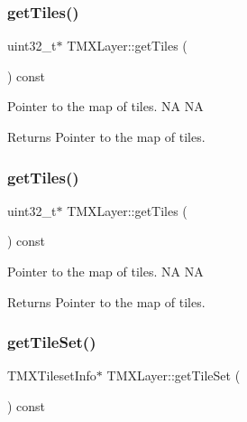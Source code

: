\subsubsection{\texorpdfstring{get\+Tiles()}{getTiles()}\hspace{0.1cm}{\footnotesize\ttfamily [1/2]}}
{\footnotesize\ttfamily uint32\+\_\+t$\ast$ T\+M\+X\+Layer\+::get\+Tiles (\begin{DoxyParamCaption}{ }\end{DoxyParamCaption}) const\hspace{0.3cm}{\ttfamily [inline]}}

Pointer to the map of tiles.  NA  NA \begin{DoxyReturn}{Returns}
Pointer to the map of tiles. 
\end{DoxyReturn}
\mbox{\label{classTMXLayer_a99a6fdaff73922809a3b2edbeb6d15e8}} 
\subsubsection{\texorpdfstring{get\+Tiles()}{getTiles()}\hspace{0.1cm}{\footnotesize\ttfamily [2/2]}}
{\footnotesize\ttfamily uint32\+\_\+t$\ast$ T\+M\+X\+Layer\+::get\+Tiles (\begin{DoxyParamCaption}{ }\end{DoxyParamCaption}) const\hspace{0.3cm}{\ttfamily [inline]}}

Pointer to the map of tiles.  NA  NA \begin{DoxyReturn}{Returns}
Pointer to the map of tiles. 
\end{DoxyReturn}
\mbox{\label{classTMXLayer_a2f1133ee7af2fa00682c68b5bca6541b}} 
\subsubsection{\texorpdfstring{get\+Tile\+Set()}{getTileSet()}\hspace{0.1cm}{\footnotesize\ttfamily [1/2]}}
{\footnotesize\ttfamily T\+M\+X\+Tileset\+Info$\ast$ T\+M\+X\+Layer\+::get\+Tile\+Set (\begin{DoxyParamCaption}{ }\end{DoxyParamCaption}) const\hspace{0.3cm}{\ttfamily [inline]}}


